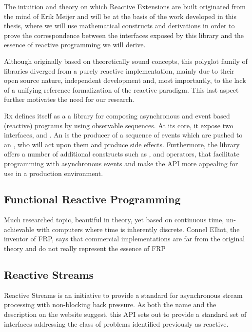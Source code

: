 The intuition and theory on which Reactive Extensions are built originated from the mind of Erik Meijer\cite{meijer2010observable} and will be at the basis of the work developed in this thesis, where we will use mathematical constructs and derivations in order to prove the correspondence between the interfaces exposed by this library and the essence of reactive programming we will derive.

Although originally based on theoretically sound concepts, this polyglot family of libraries diverged from a purely reactive implementation, mainly due to their open source nature, independent development and, most importantly, to the lack of a unifying reference formalization of the reactive paradigm. This last aspect further motivates the need for our research.

Rx defines itself as a a library for composing asynchronous and event based (reactive) programs by using observable sequences\cite{Rx.Net}. At its core, it expose two interfaces,  and . An  is the producer of a sequence of events which are pushed to an , who will act upon them and produce side effects. Furthermore, the library offers a number of additional constructs such as ,  and operators, that facilitate programming with asynchronous events and make the API more appealing for use in a production environment.

\subsection{Functional Reactive Programming}
\label{frp}
Much researched topic, beautiful in theory, yet based on continuous time, un-achievable with computers where time is inherently discrete. Connel Elliot, the inventor of FRP, says that commercial implementations are far from the original theory and do not really represent the essence of FRP

\subsection{Reactive Streams}

Reactive Streams is an initiative to provide a standard for asynchronous stream processing with non-blocking back pressure\cite{Reactive-Streams}. As both the name and the description on the website\cite{Reactive-Streams} suggest, this API sets out to provide a standard set of interfaces addressing the class of problems identified previously as reactive. 

